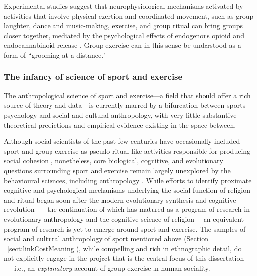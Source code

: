 Experimental studies suggest that neurophysiological mechanisms activated by activities that involve physical exertion and coordinated movement, such as group laughter, dance and music-making, exercise, and group ritual can bring groups closer together, mediated by the psychological effects of endogenous opioid and endocannabinoid release \citep{Cohen2009,Fischer2014a,Fischer2014,Sullivan2014,Tarr2016,Tarr2015}.  Group exercise can in this sense be understood as a form of ``grooming at a distance.''




\subsubsection{The infancy of science of sport and exercise}
The anthropological science of sport and exercise---a field that should offer a rich source of theory and data---is currently marred by a bifurcation between sports psychology and social and cultural anthropology, with very little substantive theoretical predictions and empirical evidence existing in the space between.

Although social scientists of the past few centuries have occasionally included sport and group exercise as pseudo ritual-like activities responsible for producing social cohesion \citep{Durkheim1965,Mauss1935,Turner1977}, nonetheless, core biological, cognitive, and evolutionary questions surrounding sport and exercise remain largely unexplored by the behavioural sciences, including anthropology \citep{Blanchard1995,Downey2005a}.    While efforts to identify proximate cognitive and psychological mechanisms underlying the social function of religion and ritual began soon after the modern evolutionary synthesis \citep{Huxley1942} and cognitive revolution \citep[e.g.,][]{Turner1986}—--the continuation of which has matured as a program of research in evolutionary anthropology and the cognitive science of religion \citep{Barrett2002,Lawson1993,Sperber1996,Whitehouse2004}---an equivalent program of research is yet to emerge around sport and exercise.  The samples of social and cultural anthropology of sport mentioned above (Section ~\ref{sect:linkCostMeaning}), while compelling and rich in ethnographic detail, do not explicitly engage in the project that is the central focus of this dissertation—--i.e., an \textit{explanatory} account of group exercise in human sociality.

